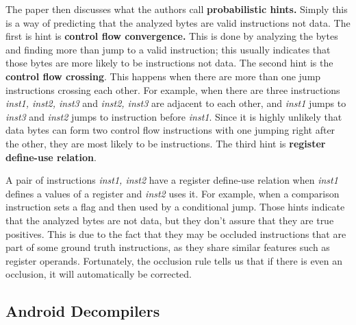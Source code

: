 \documentclass[conference,a4paper]{IEEEtran}
\begin{document}
The paper then discusses what the authors call \textbf{probabilistic hints.}
Simply this is a way of predicting that the analyzed bytes are valid instructions not data.
The first is hint is \textbf{control flow convergence.} This is done by analyzing the bytes and finding more than jump to a valid instruction; this usually indicates that those bytes are more likely to be instructions not data. The second hint is the \textbf{control flow crossing}. This happens when there are more than one jump instructions crossing each other. For example, when there are three instructions \emph{inst1, inst2, inst3} and \emph{inst2, inst3} are adjacent to each other, and \emph{inst1} jumps to \emph{inst3} and \emph{inst2} jumps to instruction before \emph{inst1}. Since it is highly unlikely that data bytes can form two control flow instructions with one jumping right after the other, they are most likely to be instructions. The third hint is \textbf{register define-use relation}.

A pair of instructions \emph{inst1, inst2} have a register define-use relation when \emph{inst1} defines a values of a register and \emph{inst2} uses it.
For example, when a comparison instruction sets a flag and then used by a conditional jump.
Those hints indicate that the analyzed bytes are not data, but they don't assure that they are true positives.
This is due to the fact that they may be occluded instructions that are part of some ground truth instructions, as they share similar features such as register operands.
Fortunately, the occlusion rule tells us that if there is even an occlusion, it will automatically be corrected.

\subsection{Android Decompilers}
\end{document}
